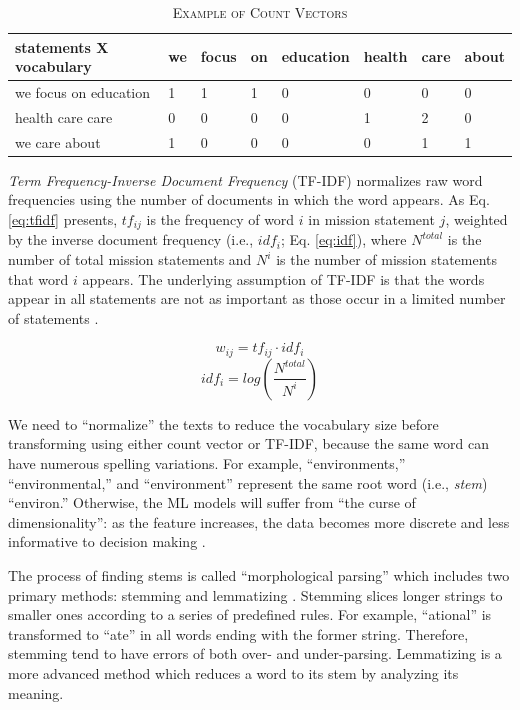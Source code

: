 \documentclass[11pt]{article}
\begin{document}
\begin{table}
\caption{\textsc{Example of Count Vectors}} \label{tab:count_vector}
\begin{tabular}{m{3.9cm}|m{0.9cm}|m{1cm}|m{0.9cm}|m{1.5cm}|m{1cm}|m{1cm}|m{0.8cm}}
    \hline
    statements X vocabulary & we & focus & on & education & health & care & about \\
    \hline
    we focus on education & 1 & 1 & 1 & 0 & 0 & 0 & 0 \\ 
    \hdashline
    health care care  & 0 & 0 & 0 & 0 & 1 & 2 & 0 \\ 
    \hdashline
    we care about & 1 & 0 & 0 & 0 & 0 & 1 & 1 \\ 
    \hline
\end{tabular}
\end{table}

\textit{Term Frequency-Inverse Document Frequency} (TF-IDF) normalizes raw word frequencies using the number of documents in which the word appears. As Eq. \ref{eq:tfidf} presents, $tf_{ij}$ is the frequency of word $i$ in mission statement $j$, weighted by the inverse document frequency (i.e., $idf_i$; Eq. \ref{eq:idf}), where $N^{total}$ is the number of total mission statements and $N^{i}$ is the number of mission statements that word $i$ appears. The underlying assumption of TF-IDF is that the words appear in all statements are not as important as those occur in a limited number of statements \parencite[278]{JurafskySpeechLanguageProcessing2017}.

\begin{equation} \label{eq:tfidf}
 w_{ij} = tf_{ij} \cdot idf_i 
\end{equation}
\begin{equation} \label{eq:idf}
idf_i = log(\frac{N^{total}}{N^{i}})
\end{equation}

We need to ``normalize'' the texts to reduce the vocabulary size before transforming using either count vector or TF-IDF, because the same word can have numerous spelling variations. For example, ``environments,'' ``environmental,'' and ``environment'' represent the same root word (i.e., \textit{stem}) ``environ.'' Otherwise, the ML models will suffer from ``the curse of dimensionality'': as the feature increases, the data becomes more discrete and less informative to decision making \parencite[94]{BellmanAdaptiveControlProcesses2015}. 

The process of finding stems is called ``morphological parsing'' which includes two primary methods: stemming and lemmatizing \parencite[25]{JurafskySpeechLanguageProcessing2017}. Stemming slices longer strings to smaller ones according to a series of predefined rules. For example, ``ational'' is transformed to ``ate'' in all words ending with the former string. Therefore, stemming tend to have errors of both over- and under-parsing. Lemmatizing is a more advanced method which reduces a word to its stem by analyzing its meaning.
\end{document}
